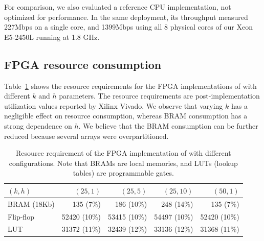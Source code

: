 For comparison, we also evaluated a reference CPU implementation, not 
optimized for performance. In the same deployment, its throughput 
measured 227Mbps on a single core, and 1399Mbps using all 8 physical cores of
our Xeon E5-2450L running at 1.8 GHz.




\subsection{FPGA resource consumption}
Table~\ref{tab:microbenchmarks} shows the resource requirements for the FPGA implementations of
\OurSys with different $k$ and $h$ parameters.  The resource requirements are
post-implementation utilization values reported by Xilinx Vivado.  We observe
that varying $k$ has a negligible effect on resource consumption, whereas BRAM
consumption has a strong dependence on $h$.  We believe that the BRAM consumption
can be further reduced because several arrays were overpartitioned.

\begin{table}
\begin{center}
\small
\begin{tabular}{ l r r r r } 
\toprule
$(k, h)$ & $(25, 1)$ & $(25, 5)$ & $(25,10)$ & $(50, 1)$ \\
\midrule
BRAM (18Kb) & 135 (7\%) & 186 (10\%) & 248 (14\%) & 135 (7\%) \\
Flip-flop & 52420 (10\%) & 53415 (10\%) & 54497 (10\%) & 52420 (10\%) \\
LUT & 31372 (11\%) & 32439 (12\%) & 33136 (12\%) & 31368 (11\%) \\
\bottomrule
\end{tabular}
\caption{Resource requirement %
of the FPGA %
implementation of \OurSys with different configurations.  Note that BRAMs are local memories,
and LUTs (lookup tables) are programmable gates.} %
\label{tab:microbenchmarks}
\end{center}
\end{table}

